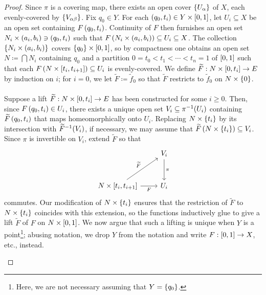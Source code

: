\documentclass[../Moduli_Spaces_of_Riemann_Surfaces.tex]{subfiles}
\begin{document}
    \begin{proof}
        Since $\pi$ is a covering map, there exists an open cover $\left\{U_\alpha\right\}$ of $X$, each evenly-covered by $\left\{V_{\alpha\beta}\right\}$. Fix $q_0\in Y$. For each $\left(q_0,t_i\right)\in Y\times\left[0,1\right]$, let $U_i\subseteq X$ be an open set containing $F\left(q_0,t_i\right)$. Continuity of $F$ then furnishes an open set $N_i\times\left(a_i,b_i\right)\ni\left(q_0,t_i\right)$ such that $F\left(N_i\times\left(a_i,b_i\right)\right)\subseteq U_i\subseteq X$. The collection $\left\{N_i\times\left(a_i,b_i\right)\right\}$ covers $\left\{q_0\right\}\times\left[0,1\right]$, so by compactness one obtains an open set $N\coloneqq\bigcap N_i$ containing $q_0$ and a partition $0=t_0<t_1<\cdots<t_n=1$ of $\left[0,1\right]$ such that each $F\left(N\times\left[t_i,t_{i+1}\right]\right)\subseteq U_i$ is evenly-covered. We define $\widetilde{F}:N\times\left[0,t_i\right]\to E$ by induction on $i$; for $i=0$, we let $\widetilde{F}\coloneqq\widetilde{f}_0$ so that $\widetilde{F}$ restricts to $\widetilde{f}_0$ on $N\times\left\{0\right\}$.\\\ \\
        Suppose a lift $\widetilde{F}:N\times\left[0,t_i\right]\to E$ has been constructed for some $i\geq0$. Then, since $F\left(q_0,t_i\right)\in U_i$, there exists a unique open set $V_i\subseteq\pi^{-1}\!\left(U_i\right)$ containing $\widetilde{F}\left(q_0,t_i\right)$ that maps homeomorphically onto $U_i$. Replacing $N\times\left\{t_i\right\}$ by its intersection with $\widetilde{F}^{-1}\!\left(V_i\right)$, if necessary, we may assume that $\widetilde{F}\left(N\times\left\{t_i\right\}\right)\subseteq V_i$. Since $\pi$ is invertible on $V_i$, extend $\widetilde{F}$ so that
        \vspace{-0.05in}
        \begin{equation*}
            \begin{tikzcd}[row sep = 0.4in]
                & V_i \ar[d, "\pi"] \\
                N\times\l[t_i,t_{i+1}\r] \ar[r, "F"'] \ar[ur, "\widetilde{F}"] & U_i
            \end{tikzcd}
        \end{equation*}
        commutes. Our modification of $N\times\left\{t_i\right\}$ ensures that the restriction of $\widetilde{F}$ to $N\times\left\{t_i\right\}$ coincides with this extension, so the functions inductively glue to give a lift $\widetilde{F}$ of $F$ on $N\times\left[0,1\right]$. We now argue that such a lifting is unique when $Y$ is a point\footnote{Here, we are not necessary assuming that $Y=\left\{q_0\right\}$.}; abusing notation, we drop $Y$ from the notation and write $F:\left[0,1\right]\to X$, etc., instead.
        \begin{itemize}

\end{itemize}
\end{proof}
\end{document}
